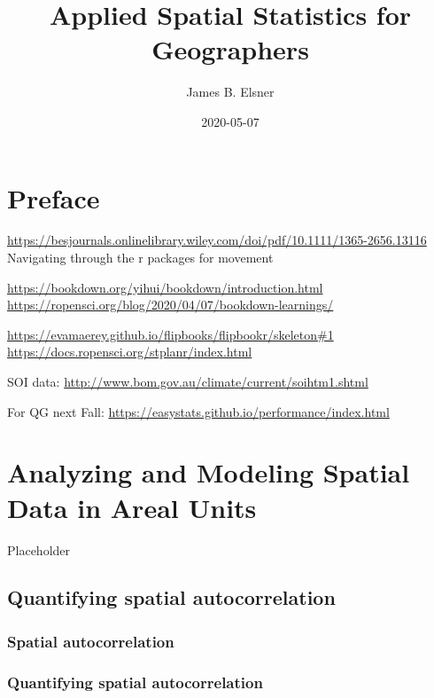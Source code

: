 \documentclass[]{book}
\title{Applied Spatial Statistics for Geographers}
\author{James B. Elsner}
\date{2020-05-07}
\begin{document}
\maketitle

{
\setcounter{tocdepth}{1}
\tableofcontents
}
\hypertarget{preface}{%
\chapter*{Preface}\label{preface}}

\url{https://besjournals.onlinelibrary.wiley.com/doi/pdf/10.1111/1365-2656.13116} Navigating through the r packages for movement

\url{https://bookdown.org/yihui/bookdown/introduction.html}
\url{https://ropensci.org/blog/2020/04/07/bookdown-learnings/}

\url{https://evamaerey.github.io/flipbooks/flipbookr/skeleton\#1}
\url{https://docs.ropensci.org/stplanr/index.html}

SOI data: \url{http://www.bom.gov.au/climate/current/soihtm1.shtml}

For QG next Fall: \url{https://easystats.github.io/performance/index.html}

\hypertarget{analyzing-and-modeling-spatial-data-in-areal-units}{%
\chapter{Analyzing and Modeling Spatial Data in Areal Units}\label{analyzing-and-modeling-spatial-data-in-areal-units}}

Placeholder

\hypertarget{quantifying-spatial-autocorrelation}{%
\section{Quantifying spatial autocorrelation}\label{quantifying-spatial-autocorrelation}}

\hypertarget{spatial-autocorrelation}{%
\subsection{Spatial autocorrelation}\label{spatial-autocorrelation}}

\hypertarget{quantifying-spatial-autocorrelation-1}{%
\subsection{Quantifying spatial autocorrelation}\label{quantifying-spatial-autocorrelation-1}}
\end{document}
